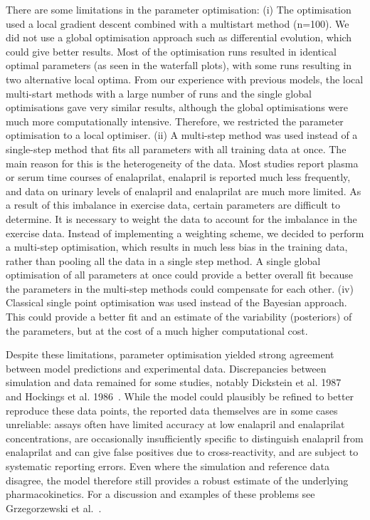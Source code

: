\documentclass[pharmaceutics,article,submit,pdftex,moreauthors]{Definitions/mdpi}
\begin{document}
There are some limitations in the parameter optimisation: (i) The optimisation used a local gradient descent combined with a multistart method (n=100). We did not use a global optimisation approach such as differential evolution, which could give better results. Most of the optimisation runs resulted in identical optimal parameters (as seen in the waterfall plots), with some runs resulting in two alternative local optima. From our experience with previous models, the local multi-start methods with a large number of runs and the single global optimisations gave very similar results, although the global optimisations were much more computationally intensive. Therefore, we restricted the parameter optimisation to a local optimiser. (ii) A multi-step method was used instead of a single-step method that fits all parameters with all training data at once. The main reason for this is the heterogeneity of the data. Most studies report plasma or serum time courses of enalaprilat, enalapril is reported much less frequently, and data on urinary levels of enalapril and enalaprilat are much more limited. As a result of this imbalance in exercise data, certain parameters are difficult to determine. It is necessary to weight the data to account for the imbalance in the exercise data. Instead of implementing a weighting scheme, we decided to perform a multi-step optimisation, which results in much less bias in the training data, rather than pooling all the data in a single step method. A single global optimisation of all parameters at once could provide a better overall fit because the parameters in the multi-step methods could compensate for each other. (iv) Classical single point optimisation was used instead of the Bayesian approach. This could provide a better fit and an estimate of the variability (posteriors) of the parameters, but at the cost of a much higher computational cost. 

Despite these limitations, parameter optimisation yielded strong agreement between model predictions and experimental data. Discrepancies between simulation and data remained for some studies, notably Dickstein et al. 1987~\cite{Dickstein1987} and Hockings et al. 1986~\cite{Hockings1986}. While the model could plausibly be refined to better reproduce these data points, the reported data themselves are in some cases unreliable: assays often have limited accuracy at low enalapril and enalaprilat concentrations, are occasionally insufficiently specific to distinguish enalapril from enalaprilat and can give false positives due to cross-reactivity, and are subject to systematic reporting errors. Even where the simulation and reference data disagree, the model therefore still provides a robust estimate of the underlying pharmacokinetics. For a discussion and examples of these problems see Grzegorzewski et al.~\cite{Grzegorzewski2021a}.
\end{document}
